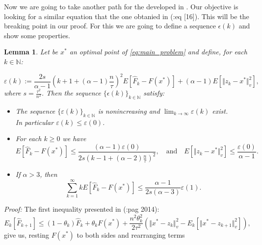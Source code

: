 \documentclass{article}
\newcommand{\N}{\mathbb{N}}
\newcommand{\x}{x^*}
\newtheorem{lema}{Lemma}
\begin{document}
Now we are going to take another path for the developed in \cite{Fercoq_Richtarik}. Our objective is looking for a similar equation that the one obtanied in (\cite{HA_JP}:eq [16]). This will be the breaking point in our proof. For this we are going to define a sequence $\epsilon(k)$ and show some properties.
\begin{lema}
Let be $\x$ an optimal point of \eqref{eq:main_problem} and define, for each $k \in \N$:

\begin{equation}
\label{eq:Funcional_de_k}
\varepsilon(k) := \frac{2s}{\alpha-1}\left(k+1+(\alpha-1)\frac{n}{\tau} \right)^2 E \left[\hat{F}_k - F(\x) \right] + (\alpha-1)E\left[\Vert z_k - \x \Vert_v^2 \right],
\end{equation}
where $s = \frac{\tau^2}{n^2}$. Then the sequence $\lbrace \epsilon(k)\rbrace_{k\in \N}$ satisfy:
\begin{itemize}
	\item[i)] The sequence $\lbrace \varepsilon(k)\rbrace_{k\in \N}$ is nonincreasing and $\displaystyle \lim_{k \rightarrow \infty} \varepsilon(k)$ exist. \\
	In particular $\varepsilon(k) \leq \varepsilon(0)$.
	\item[ii)] For each $k \geq 0$ we have
		\begin{equation*}
			E\left[ \hat{F}_k - F(\x)\right] \leq \frac{(\alpha-1)\varepsilon(0)}{2s\left(k-1+(\alpha-2)\frac{n}{\tau} \right)^2}, \quad \text{and} \quad E\left[ \Vert z_k -\x \Vert_v^2 \right] \leq \frac{\varepsilon(0)}{\alpha-1}.
		\end{equation*}
	\item[iii)] If $\alpha > 3$, then
		\begin{equation*}
			\sum_{k = 1}^{\infty} kE\left[ \hat{F}_k - F(\x) \right] \leq \frac{\alpha-1}{2s(\alpha-3)}\varepsilon(1).
		\end{equation*}
\end{itemize}
\label{lema_varep}
\end{lema}

\emph{Proof:} The first inequality presented in (\cite{Fercoq_Richtarik}:pag 2014):
\begin{equation*}
	E_k \left[ \hat{F}_{k+1} \right] \leq (1-\theta_k)\hat{F}_k + \theta_k F(\x) + \frac{n^2\theta_k^2}{2\tau^2} \left(\Vert \x - z_k\Vert_v^2 - E_k\left[\Vert \x-z_{k+1} \Vert_v^2 \right] \right),
\end{equation*}
give us, resting $F(\x)$ to both sides and rearranging terms
\end{document}

